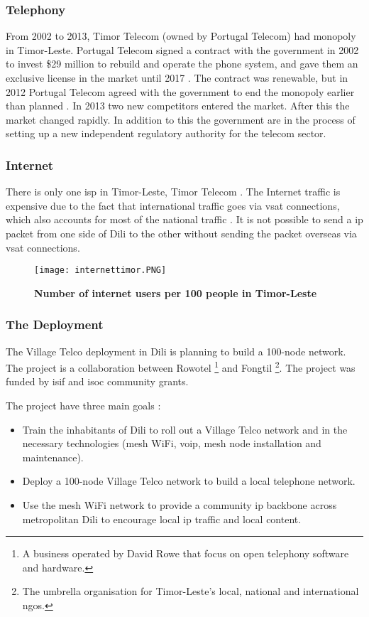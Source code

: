\subsubsection{Telephony}
From 2002 to 2013, Timor Telecom (owned by Portugal Telecom) had monopoly in Timor-Leste. Portugal Telecom signed a contract with the government in 2002 to invest \$29 million to rebuild and operate the phone system, and gave them an exclusive license in the market until 2017 \cite{wikitelecomeasttimor}. The contract was renewable, but in 2012 Portugal Telecom agreed with the government to end the monopoly earlier than planned \cite{budde}. In 2013 two new competitors entered the market. After this the market changed rapidly. In addition to this the government are in the process of setting up a new independent regulatory authority for the telecom sector. 

\subsubsection{Internet} There is only one \gls{isp} in Timor-Leste, Timor Telecom \cite{wikitelecomeasttimor}. The Internet traffic is expensive due to the fact that international traffic goes via \gls{vsat} connections, which also accounts for most of the national traffic \cite{vtdili}. It is not possible to send a \gls{ip} packet from one side of Dili to the other without sending the packet overseas via \gls{vsat} connections. 


\begin{figure}[t]
\centering
\texttt{[image: internettimor.PNG]}
\caption[Number of internet users per 100 people in Timor-Leste]{\textbf{Number of internet users per 100 people in Timor-Leste}}
\label{fig:internettimor}
\end{figure}

\subsubsection{The Deployment}
The Village Telco deployment in Dili is planning to build a 100-node network. The project is a collaboration between Rowotel \footnote{A business operated by David Rowe that focus on open telephony software and hardware.} and Fongtil \footnote{The umbrella organisation for Timor-Leste’s local, national and international \glspl{ngo}.}. The project was funded by \gls{isif} and \gls{isoc} community grants. 

The project have three main goals \cite{vtdili}:
\begin{itemize}
\item Train the inhabitants of Dili to roll out a Village Telco network and in the necessary technologies (mesh WiFi, \gls{voip}, mesh node installation and maintenance).
\item Deploy a 100-node Village Telco network to build a local telephone network.
\item Use the mesh WiFi network to provide a community \gls{ip} backbone across metropolitan Dili to encourage local \gls{ip} traffic and local content.
\end{itemize}

